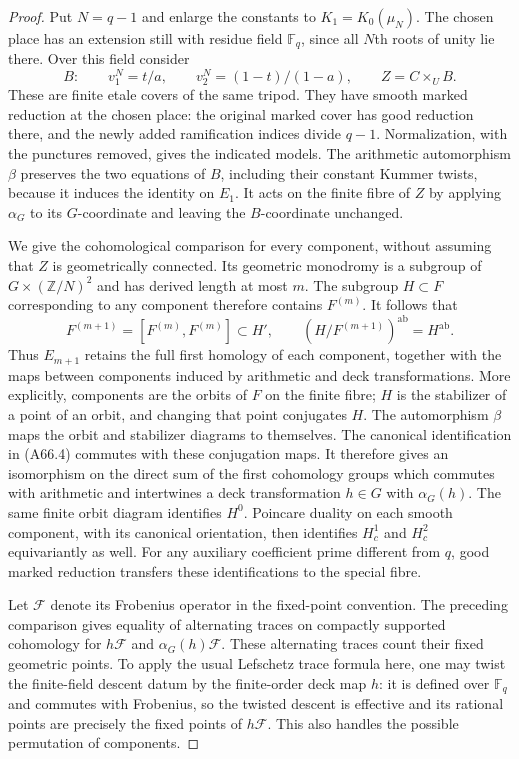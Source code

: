 \documentclass[11pt,oneside]{article}
\begin{document}
\begin{proof}
Put $N=q-1$ and enlarge the constants to
$K_1=K_0(\mu_N)$. The chosen place has an
extension still with residue field $\mathbb F_q$,
since all $N$th roots of unity lie there.
Over this field consider
\[
 B:\qquad v_1^N=t/a,\qquad
             v_2^N=(1-t)/(1-a),\qquad
                   Z=C\times_U B.                    \tag{A66.3}
\]
These are finite etale covers of the same tripod.
They have smooth marked reduction at the chosen
place: the original marked cover has good
reduction there, and the newly added ramification
indices divide $q-1$. Normalization, with the
punctures removed, gives the indicated models.
The arithmetic automorphism $\beta$ preserves
the two equations of $B$, including their
constant Kummer twists, because it induces the
identity on $E_1$.
It acts on the finite fibre of $Z$ by applying
$\alpha_G$ to its $G$-coordinate and leaving the
$B$-coordinate unchanged.

We give the cohomological comparison for every
component, without assuming that $Z$ is
geometrically connected. Its geometric monodromy
is a subgroup of $G\times(\mathbb Z/N)^2$ and
has derived length at most $m$.
The subgroup $H\subset F$ corresponding to any
component therefore contains $F^{(m)}$.
It follows that
\[
 F^{(m+1)}=[F^{(m)},F^{(m)}]\subset H',
 \qquad
 (H/F^{(m+1)})^{\mathrm{ab}}=H^{\mathrm{ab}}.
                                                        \tag{A66.4}
\]
Thus $E_{m+1}$ retains the full first homology
of each component, together with the maps
between components induced by arithmetic and
deck transformations. More explicitly, components
are the orbits of $F$ on the finite fibre;
$H$ is the stabilizer of a point of an orbit,
and changing that point conjugates $H$.
The automorphism $\beta$ maps the orbit and
stabilizer diagrams to themselves. The canonical
identification in (A66.4) commutes with these
conjugation maps. It therefore gives an
isomorphism on the direct sum of the first
cohomology groups which commutes with arithmetic
and intertwines a deck transformation $h\in G$
with $\alpha_G(h)$.
The same finite orbit diagram identifies
$H^0$. Poincare duality on each smooth component,
with its canonical orientation, then identifies
$H_c^1$ and $H_c^2$ equivariantly as well.
For any auxiliary coefficient prime different
from $q$, good marked reduction transfers these
identifications to the special fibre.

Let $\mathcal F$ denote its Frobenius operator
in the fixed-point convention. The preceding
comparison gives equality of alternating traces
on compactly supported cohomology for
$h\mathcal F$ and $\alpha_G(h)\mathcal F$.
These alternating traces count their fixed
geometric points. To apply the usual
Lefschetz trace formula here, one may twist the
finite-field descent datum by the finite-order
deck map $h$: it is defined over $\mathbb F_q$
and commutes with Frobenius, so the twisted
descent is effective and its rational points
are precisely the fixed points of $h\mathcal F$.
This also handles the possible permutation of
components.


\end{proof}
\end{document}
